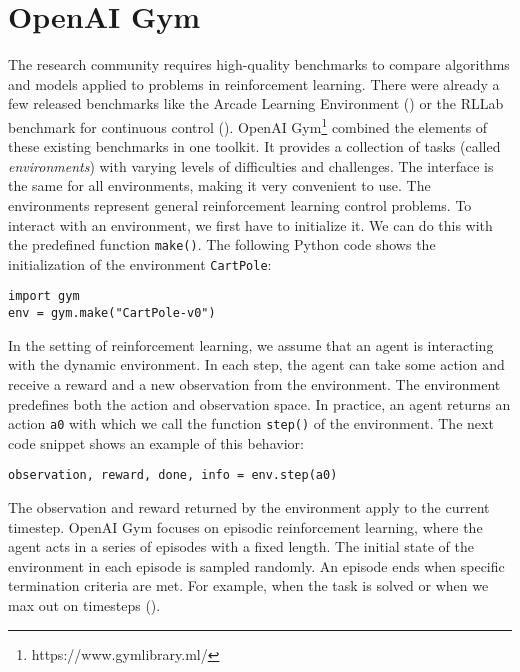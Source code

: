 

\section{OpenAI Gym}
\label{sec:gym}
The research community requires high-quality benchmarks to compare algorithms and models applied to problems in reinforcement learning. There were already a few released benchmarks like the Arcade Learning Environment (\cite{bellemare2013arcade}) or the RLLab benchmark for continuous control (\cite{duan2016benchmarking}). OpenAI Gym\footnote{https://www.gymlibrary.ml/} combined the elements of these existing benchmarks in one toolkit. It provides a collection of tasks (called \textit{environments}) with varying levels of difficulties and challenges. The interface is the same for all environments, making it very convenient to use. The environments represent general reinforcement learning control problems. To interact with an environment, we first have to initialize it. We can do this with the predefined function \verb|make()|. The following Python code shows the initialization of the environment \verb|CartPole|:
\begin{verbatim}
import gym
env = gym.make("CartPole-v0")
\end{verbatim}
In the setting of reinforcement learning, we assume that an agent is interacting with the dynamic environment. In each step, the agent can take some action and receive a reward and a new observation from the environment. The environment predefines both the action and observation space. In practice, an agent returns an action \verb|a0| with which we call the function \verb|step()| of the environment. The next code snippet shows an example of this behavior:
\begin{verbatim}
observation, reward, done, info = env.step(a0)
\end{verbatim}
The observation and reward returned by the environment apply to the current timestep. OpenAI Gym focuses on episodic reinforcement learning, where the agent acts in a series of episodes with a fixed length. The initial state of the environment in each episode is sampled randomly. An episode ends when specific termination criteria are met. For example, when the task is solved or when we max out on timesteps (\cite{1606.01540}).

